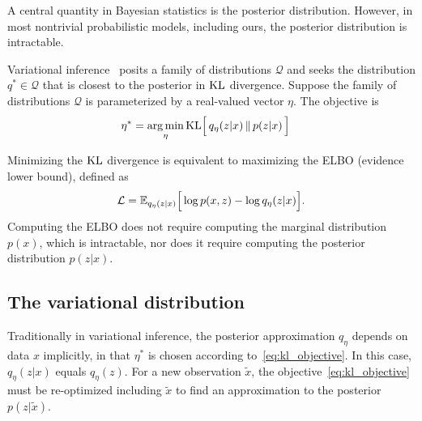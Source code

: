 A central quantity in Bayesian statistics is the posterior distribution. 
However, in most nontrivial probabilistic models, including ours, the posterior distribution is intractable.

Variational inference~\cite{Blei_2017_vi_review, Jordan_intro_vi, Wainwrite_graph_models_vi}
posits a family of distributions $\mathcal{Q}$ and seeks
the distribution $q^*\in \mathcal{Q}$ that is closest to the posterior
in $\textrm{KL}$ divergence. Suppose the family of distributions $\mathcal{Q}$ is parameterized by a real-valued vector $\eta$. The objective is 
\begin{align}
   \eta^* &= \operatorname*{arg\,min}_{\eta} \mathrm{KL}\Big[\,q_\eta(z | x)\, \| \,p(z | x )\,\Big] 
   \label{eq:kl_objective}
\end{align}

Minimizing the $\textrm{KL}$ divergence is equivalent to maximizing the ELBO (evidence lower bound), defined as 
\begin{align}
    \mathcal{L} = 
    \mathbb{E}_{q_\eta(z | x)}\Big[\log p(x, z) - \log q_\eta(z | x)\Big].
    \label{eq:elbo}
\end{align}
Computing the ELBO does not require computing the marginal distribution $p(x)$, which is intractable, nor does it
require computing the posterior distribution $p(z | x)$.

\subsection{The variational distribution}
\label{sec:var_distr}
Traditionally in variational inference, the posterior approximation 
$q_\eta$ depends on data $x$ implicitly, 
in that $\eta^*$ is chosen according to~\eqref{eq:kl_objective}. In this case, $q_\eta(z | x)$ equals $q_\eta(z)$. For a new observation $\tilde x$, the objective~\eqref{eq:kl_objective} must be re-optimized including $\tilde x$ to find an 
approximation to the posterior $p(z | \tilde x)$. 

